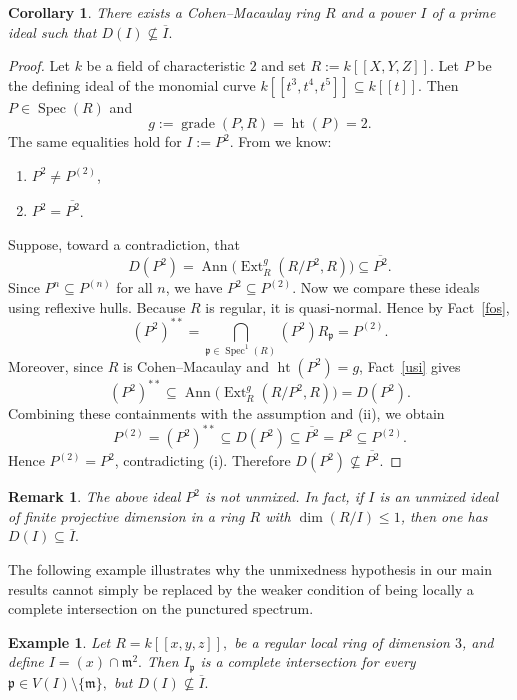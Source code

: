 \documentclass[11pt,a4paper]{amsart}
\numberwithin{equation}{section}
\newtheorem{corollary}[theorem]{Corollary}
\newtheorem{remark}[theorem]{Remark}
\newtheorem{example}[theorem]{Example}
\DeclareMathOperator{\grade}{grade}
\DeclareMathOperator{\Ann}{Ann}\DeclareMathOperator{\ann}{Ann}
\DeclareMathOperator{\Spec}{Spec}
\DeclareMathOperator{\Ht}{ht}
\DeclareMathOperator{\Ext}{Ext}
\newcommand{\fp}{\mathfrak{p}}
\begin{document}
\begin{corollary}\label{n}
	There exists a Cohen–Macaulay ring $R$ and a power $I$ of a prime ideal such that
	\(
	D(I)\nsubseteq \overline{I}.
	\)
\end{corollary}

\begin{proof}
	Let $k$ be a field of characteristic $2$ and set
	\(
	R:=k[[X,Y,Z]].
	\)
	Let $P$ be the defining ideal of the monomial curve $k[[t^3,t^4,t^5]] \subseteq k[[t]]$. Then $P\in\Spec(R)$ and
	\[
	g:=\grade(P,R)=\Ht(P)=2.
	\]
	The same equalities hold for $I:=P^2$.
	From \cite[3.7]{h} we know:
	\begin{enumerate}
		\item[(i)] $P^2 \ne P^{(2)}$,
		\item[(ii)] $P^2 = \overline{P^2}$.
	\end{enumerate}
	
	Suppose, toward a contradiction, that
	\[
	D(P^2)=\Ann\!\big(\Ext^g_R(R/P^2,R)\big)\subseteq \overline{P^2}.
	\]
	Since $P^n \subseteq P^{(n)}$ for all $n$, we have $P^2 \subseteq P^{(2)}$. Now we compare these ideals using reflexive hulls.
	Because $R$ is regular, it is quasi-normal. Hence by Fact~\ref{fos},
	\[
	(P^2)^{**}=\bigcap_{\fp\in \Spec^1(R)} (P^2)R_\fp = P^{(2)}.
	\]
	Moreover, since $R$ is Cohen–Macaulay and $\Ht(P^2)=g$, Fact~\ref{usi} gives
	\[
	(P^2)^{**}\subseteq \Ann\!\big(\Ext^g_R(R/P^2,R)\big)=D(P^2).
	\]
	Combining these containments with the assumption and (ii), we obtain
	\[
	P^{(2)}=(P^2)^{**}\subseteq D(P^2)\subseteq \overline{P^2}=P^2\subseteq P^{(2)}.
	\]
	Hence $P^{(2)}=P^2$, contradicting (i). Therefore
	\(
	D(P^2)\nsubseteq \overline{P^2}.
	\)
\end{proof}

\begin{remark}
	The above ideal $P^2$ is not unmixed. In fact, if $I$ is an unmixed ideal of finite projective dimension in a ring $R$ with $\dim(R/I)\le 1$, then one has
	\(
	D(I)\subseteq \overline{I}.
	\)
\end{remark}
	The following example illustrates why the unmixedness hypothesis in our main results cannot simply be replaced by the weaker condition of being locally a complete intersection on the punctured spectrum.
\begin{example}\label{mn1} 
Let
$
	R = k[[x,y,z]],
$
	be a regular local ring of dimension \(3\), and define
$
	I = (x) \cap \mathfrak m^2.
$
Then \(I_{\mathfrak p}\) is a complete intersection for every
	\(
	\mathfrak p \in V(I) \setminus \{\mathfrak m\},
	\)
	but
	\( 
 {D(I) \nsubseteq \overline{I}}.
	\)
\end{example}
\end{document}
